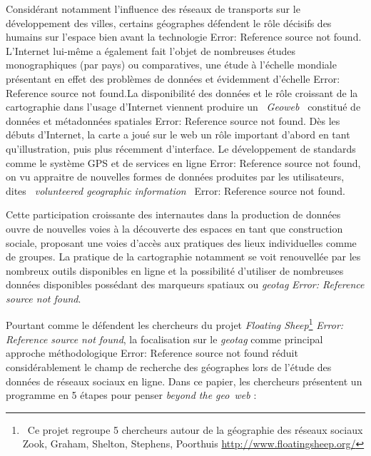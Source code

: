 \bigskip


\bigskip

{\sffamily\color{black}
Consid\'erant notamment l'influence des r\'eseaux de transports sur le d\'eveloppement des villes, certains g\'eographes
d\'efendent le r\^ole d\'ecisifs des humains sur l'espace bien avant la technologie Error: Reference source not found.
L'Internet lui-m\^eme a \'egalement fait l'objet de nombreuses \'etudes monographiques (par pays) ou comparatives, une
\'etude \`a l'\'echelle mondiale pr\'esentant en effet des probl\`emes de donn\'ees et \'evidemment d'\'echelle Error:
Reference source not found.La disponibilit\'e des donn\'ees et le r\^ole croissant de la cartographie dans l'usage
d'Internet viennent produire un {\guillemotleft}~\textit{Geoweb}~{\guillemotright} constitu\'e de donn\'ees et
m\'etadonn\'ees spatiales Error: Reference source not found. D\`es les d\'ebuts d'Internet, la carte a jou\'e sur le
web un r\^ole important d'abord en tant qu'illustration, puis plus r\'ecemment d'interface. Le d\'eveloppement de
standards comme le syst\`eme GPS et de services en ligne Error: Reference source not found, on vu appraitre de
nouvelles formes de donn\'ees produites par les utilisateurs, dites \textit{{\guillemotleft}~volunteered geographic
information~{\guillemotright}} Error: Reference source not found. }


\bigskip

{\sffamily\color{black}
Cette participation croissante des internautes dans la production de donn\'ees ouvre de nouvelles voies \`a la
d\'ecouverte des espaces en tant que construction sociale, proposant une voies d'acc\`es aux pratiques des lieux
individuelles comme de groupes. La pratique de la cartographie notamment se voit renouvell\'ee par les nombreux outils
disponibles en ligne et la possibilit\'e d'utiliser de nombreuses donn\'ees disponibles poss\'edant des marqueurs
spatiaux ou \textit{geotag }\textit{Error: Reference source not found}. }


\bigskip

{\sffamily\color{black}
Pourtant comme le d\'efendent les chercheurs du projet \textit{Floating Sheep}\footnote{\ Ce projet regroupe 5
chercheurs autour de la g\'eographie des r\'eseaux sociaux Zook, Graham, Shelton, Stephens, Poorthuis
\url{http://www.floatingsheep.org/}}\textit{ }\textit{Error: Reference source not found}, la focalisation sur le
\textit{geotag} comme principal approche m\'ethodologique Error: Reference source not found r\'eduit consid\'erablement
le champ de recherche des g\'eographes lors de l'\'etude des donn\'ees de r\'eseaux sociaux en ligne. Dans ce papier,
les chercheurs pr\'esentent un programme en 5 \'etapes pour penser \textit{{\textquotedbl}beyond the
geo~web{\textquotedbl}} :}

